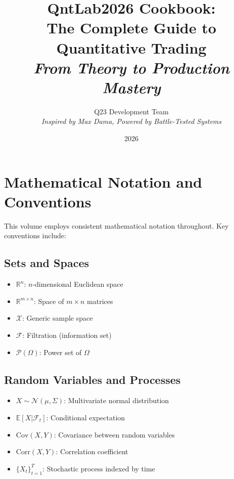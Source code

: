 \documentclass[11pt,letterpaper,openany]{book}
\title{QntLab2026 Cookbook: \\
The Complete Guide to Quantitative Trading \\
\textit{From Theory to Production Mastery}}
\author{Q23 Development Team \\
\textit{Inspired by Max Dama, Powered by Battle-Tested Systems}}
\date{2026}
\newcommand{\R}{\mathbb{R}}
\newcommand{\Cov}{\mathrm{Cov}}
\newcommand{\Corr}{\mathrm{Corr}}
\begin{document}
\makeatletter
\@openrightfalse
\makeatother

\maketitle

\setcounter{tocdepth}{4}

\renewcommand{\contentsname}{\Large\textbf{Mathematical Contents}}
\tableofcontents

\chapter*{Mathematical Notation and Conventions}

This volume employs consistent mathematical notation throughout. Key conventions include:

\section*{Sets and Spaces}
\begin{itemize}
    \item $\R^n$: $n$-dimensional Euclidean space
    \item $\R^{m \times n}$: Space of $m \times n$ matrices
    \item $\mathcal{X}$: Generic sample space
    \item $\mathcal{F}$: Filtration (information set)
    \item $\mathcal{P}(\Omega)$: Power set of $\Omega$
\end{itemize}

\section*{Random Variables and Processes}
\begin{itemize}
    \item $X \sim \mathcal{N}(\mu, \Sigma)$: Multivariate normal distribution
    \item $\mathbb{E}[X|\mathcal{F}_t]$: Conditional expectation
    \item $\Cov(X,Y)$: Covariance between random variables
    \item $\Corr(X,Y)$: Correlation coefficient
    \item $\{X_t\}_{t=1}^T$: Stochastic process indexed by time
\end{itemize}
\end{document}
